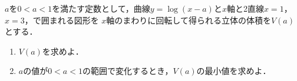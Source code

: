 \documentclass[../../main.tex]{subfiles}
\begin{document}
$a$を$0<a<1$を満たす定数として，曲線$y=\log(x-a)$と$x$軸と2直線$x=1$，$x=3$，で囲まれる図形を
$x$軸のまわりに回転して得られる立体の体積を$V(a)$とする．
\begin{enumerate}
  \item $V(a)$を求めよ．
  \item $a$の値が$0<a<1$の範囲で変化するとき，$V(a)$の最小値を求めよ．
\end{enumerate}
\end{document}
